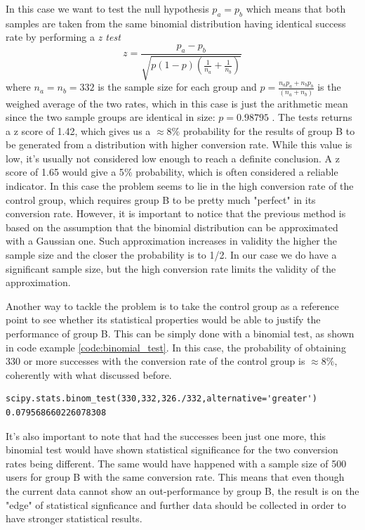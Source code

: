 \documentclass[paper=a4, fontsize=10pt]{report}
\begin{document}
In this case we want to test the null hypothesis $p_{a} = p_{b}$ which means that both samples are taken from the same binomial distribution having identical
 success rate by performing a \textit{z test}
\begin{equation}
 z = \frac{p_{a}-p_{b}}{\sqrt{p(1-p)(\frac{1}{n_{a}} + \frac{1}{n_{b}})}}
\end{equation}
where $n_{a} = n_{b} = 332 $ is the sample size for each group and $ p = \frac{n_{a}p_{a} + n_{b}p_{b}}{ (n_{a} + n_{b})}$ is the weighed average of the two rates,
which in this case is just the arithmetic mean since the two sample groups are identical in size: $p = 0.98795$
. The tests returns a z score of 1.42, which gives us a $\approx 8\%$ probability for the results of group B to be generated from a distribution with higher
conversion rate.
While this value is low, it's usually not considered low enough to reach a definite conclusion. A z score of 1.65 would give a 5$\%$ probability,
which is often considered a reliable indicator. In this case the problem seems to lie in the high conversion rate of the control group,
which requires group B to be pretty much "perfect" in its conversion rate.
However, it is important to notice that the previous method is based on the assumption that the binomial distribution can be approximated with a Gaussian one.
Such approximation increases in validity the higher the sample size and the closer the probability is to 1/2. In our case we do have a significant sample size, but the 
high conversion rate limits the validity of the approximation.

Another way to tackle the problem is to take the control group as a reference point to see whether its statistical properties would be
able to justify the performance of group B. This can be simply done with a binomial test, as shown in code example \ref{code:binomial_test}. In this case, 
the probability
of obtaining 330 or more successes with the conversion rate of the control group is $\approx 8\%$, 
coherently with what discussed before.

\footnotesize
\begin{lstlisting}[frame=single,caption= Binomial Test\label{code:binomial_test}]
scipy.stats.binom_test(330,332,326./332,alternative='greater')
0.079568660226078308
\end{lstlisting}
\normalsize

It's also important to note that had the successes been just one more, this binomial test would have shown statistical significance
for the two conversion rates being different. The same would have happened with a sample size of 500 users for group B with the 
same conversion rate.
This means that even though the current data cannot show an out-performance by 
group B, the result is on the "edge" of statistical signficance and further data should be collected in order to have stronger
statistical results.
\end{document}
